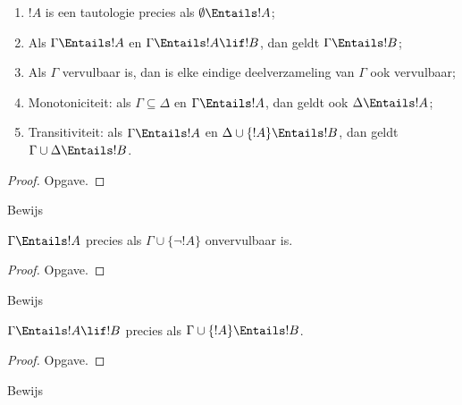 \documentclass[openany]{memoir}
\begin{document}
\begin{prop}
\begin{enumerate} 
\item $!A$ is een tautologie precies als
  $\emptyset \Entails !A$; 
\item Als $\Gamma \Entails !A$ en $\Gamma \Entails !A \lif !B$, dan
  geldt $\Gamma \Entails !B$;
\item Als $\Gamma$ vervulbaar is, dan is elke eindige deelverzameling
  van $\Gamma$ ook vervulbaar; 
\item {} Monotoniciteit: als
  $\Gamma \subseteq \Delta$ en $\Gamma \Entails !A$, dan geldt ook
  $\Delta \Entails !A$;
\item {} Transitiviteit: als $\Gamma \Entails !A$ en
  $\Delta \cup \{ !A\} \Entails !B$, dan geldt
  $\Gamma \cup \Delta \Entails !B$.
\end{enumerate}
\end{prop}

\begin{proof}
Opgave.
\end{proof}

\begin{prob}
Bewijs 
\end{prob}

\begin{prop}
  $\Gamma \Entails !A$ precies als $\Gamma \cup \{\lnot !A\}$
  onvervulbaar is.
\end{prop}

\begin{proof}
Opgave.
\end{proof}

\begin{prob}
Bewijs 
\end{prob}

\begin{thm}
   $\Gamma \Entails !A \lif !B$ precies als
  $\Gamma \cup \{!A\} \Entails !B$.
\end{thm}

\begin{proof}
Opgave.
\end{proof}

\begin{prob}
Bewijs 
\end{prob}
\endgroup
\OLEndChapterHook
\end{document}
